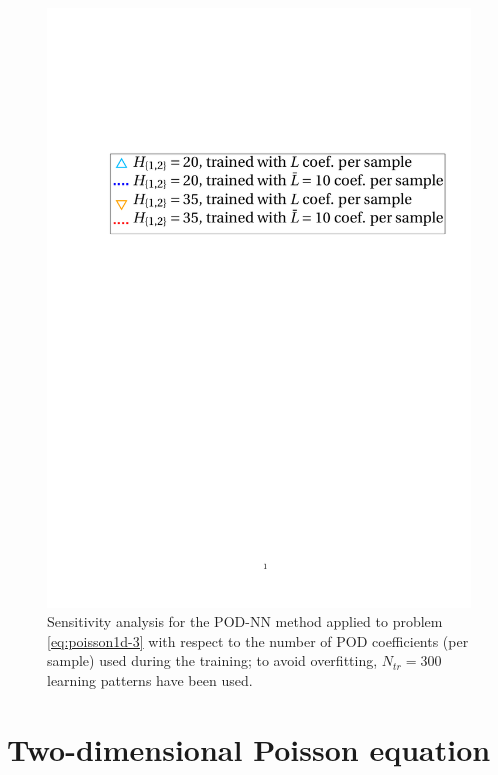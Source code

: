 \documentclass[12pt, a4paper, twoside, openright, notitlepage]{report}
\numberwithin{equation}{chapter}
\theoremstyle{theorem}
\theoremstyle{definition}
\theoremstyle{remark}
\theoremstyle{proposition}
\numberwithin{figure}{chapter}
\begin{document}
\begin{figure}[H]
			\includegraphics[scale = 0.42, trim = {2cm 11.25cm 1cm 3cm}, clip]{poisson1d_3_nn_test_legend}
			
			\caption{Sensitivity analysis for the POD-NN method applied to problem \eqref{eq:poisson1d-3} with respect to the number of POD coefficients (per sample) used during the training; to avoid overfitting, $N_{tr} = 300$ learning patterns have been used.}
			\label{fig:poisson1d-3-fig3}
		\end{figure}
		
	\clearpage
					
	\section{Two-dimensional Poisson equation}
	\label{section:Two-dimensional Poisson equation (results)}
	
\end{document}
